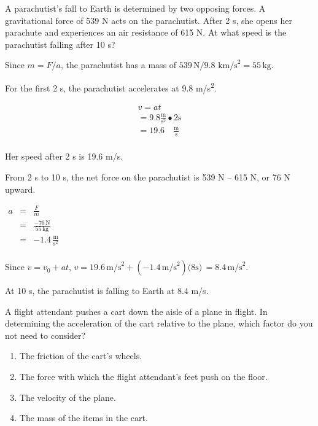 \documentclass[
]{book}
\providecommand{\tightlist}{%
  \setlength{\itemsep}{0pt}\setlength{\parskip}{0pt}}
\newenvironment{ap-test-prep}{}{}
\begin{document}
\begin{ap-test-prep}
\hypertarget{fs-id1651805}{}
\leavevmode\hypertarget{fs-id1653268}{}%
A parachutist's fall to Earth is determined by two opposing forces. A
gravitational force of 539 N acts on the parachutist. After 2 s, she
opens her parachute and experiences an air resistance of 615 N. At what
speed is the parachutist falling after 10 s?

\leavevmode\hypertarget{fs-id1594989}{}%
Since \(m = F/a\), the parachutist has a mass of
\(539\,\text{N/9}\text{.8~km/s}^{\text{2}} = 55\,\text{kg}\).

For the first 2 s, the parachutist accelerates at 9.8 m/s\textsuperscript{2}.

\[\begin{matrix}
{v = at} \\
{= 9.8\frac{\text{m}}{\text{s}^{\text{2}}} \bullet 2\text{s}} \\
{= 19.6\quad\frac{\text{m}}{\text{s}}} \\
\end{matrix}\]

Her speed after 2 s is 19.6 m/s.

From 2 s to 10 s, the net force on the parachutist is 539 N -- 615 N, or
76 N upward.

\(\begin{matrix} a & = & \frac{F}{m} \\  & = & \frac{- 76\,\text{N}}{55\,\text{kg}} \\  & = & {- 1.4\,\frac{\text{m}}{\text{s}^{2}}} \\ \end{matrix}\)

Since \(v = v_{0} + at\),
\(v = 19.6\,\text{m/s}^{\text{2}} + ( - 1.4\,\text{m/s}^{\text{2}})(8\text{s)}\, = 8.4\,\text{m/s}^{\text{2}}\).

At 10 s, the parachutist is falling to Earth at 8.4 m/s.

\hypertarget{fs-id1437308}{}
\leavevmode\hypertarget{fs-id1343082}{}%
A flight attendant pushes a cart down the aisle of a plane in flight. In
determining the acceleration of the cart relative to the plane, which
factor do you not need to consider?

\begin{enumerate}
\def\labelenumi{\alph{enumi}.}
\tightlist
\item
  The friction of the cart's wheels.
\item
  The force with which the flight attendant's feet push on the floor.
\item
  The velocity of the plane.
\item
  The mass of the items in the cart.
\end{enumerate}


\end{ap-test-prep}
\end{document}
